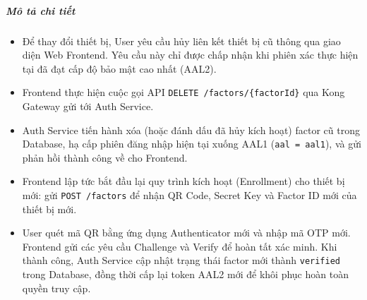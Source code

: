 \subparagraph{Mô tả chi tiết}
\begin{itemize}
\item Để thay đổi thiết bị, User yêu cầu hủy liên kết thiết bị cũ thông qua giao diện Web Frontend. Yêu cầu này chỉ được chấp nhận khi phiên xác thực hiện tại đã đạt cấp độ bảo mật cao nhất (AAL2).
\item Frontend thực hiện cuộc gọi API \texttt{DELETE /factors/\{factorId\}} qua Kong Gateway gửi tới Auth Service.
\item Auth Service tiến hành xóa (hoặc đánh dấu đã hủy kích hoạt) factor cũ trong Database, hạ cấp phiên đăng nhập hiện tại xuống AAL1 (\texttt{aal = aal1}), và gửi phản hồi thành công về cho Frontend.
\item Frontend lập tức bắt đầu lại quy trình kích hoạt (Enrollment) cho thiết bị mới: gửi \texttt{POST /factors} để nhận QR Code, Secret Key và Factor ID mới của thiết bị mới.
\item User quét mã QR bằng ứng dụng Authenticator mới và nhập mã OTP mới. Frontend gửi các yêu cầu Challenge và Verify để hoàn tất xác minh. Khi thành công, Auth Service cập nhật trạng thái factor mới thành \texttt{verified} trong Database, đồng thời cấp lại token AAL2 mới để khôi phục hoàn toàn quyền truy cập.
\end{itemize}

